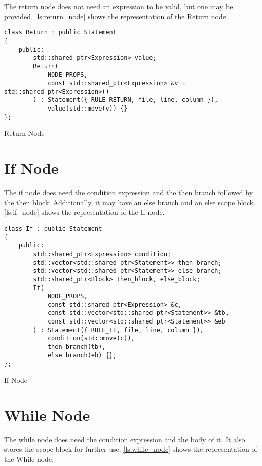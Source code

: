 The return node does not need an expression to be valid, but one may be provided.
\autoref{ls:return_node} shows the representation of the Return node.

\begin{listing}[H]
\begin{verbatim}
class Return : public Statement
{
    public:
        std::shared_ptr<Expression> value;
        Return(
            NODE_PROPS,
            const std::shared_ptr<Expression> &v = std::shared_ptr<Expression>()
        ) : Statement({ RULE_RETURN, file, line, column }),
            value(std::move(v)) {}
};
\end{verbatim}
\caption{Return Node}
\label{ls:return_node}
\end{listing}

\section{If Node}

The if node does need the condition expression and the then branch followed by the then block.
Additionally, it may have an else branch and an else scope block.
\autoref{ls:if_node} shows the representation of the If node.

\begin{listing}[H]
\begin{verbatim}
class If : public Statement
{
    public:
        std::shared_ptr<Expression> condition;
        std::vector<std::shared_ptr<Statement>> then_branch;
        std::vector<std::shared_ptr<Statement>> else_branch;
        std::shared_ptr<Block> then_block, else_block;
        If(
            NODE_PROPS,
            const std::shared_ptr<Expression> &c,
            const std::vector<std::shared_ptr<Statement>> &tb,
            const std::vector<std::shared_ptr<Statement>> &eb
        ) : Statement({ RULE_IF, file, line, column }),
            condition(std::move(c)),
            then_branch(tb),
            else_branch(eb) {};
};
\end{verbatim}
\caption{If Node}
\label{ls:if_node}
\end{listing}

\section{While Node}

The while node does need the condition expression and the body of it.
It also stores the scope block for further use.
\autoref{ls:while_node} shows the representation of the While node.

